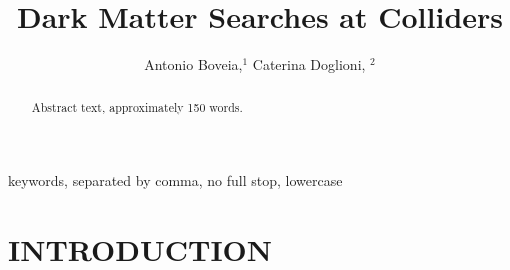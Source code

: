 \documentclass{ar-1col}
\begin{document}

\title{Dark Matter Searches at Colliders}

\newcommand{\chiDM}{\ensuremath{\chi}\xspace}
\newcommand{\IP}{\ensuremath{\textrm{IP}}\xspace}
\newcommand{\mMed}{\ensuremath{M_{\rm{med}}}\xspace}
\newcommand{\mmed}{\mMed}
\newcommand{\gDM}{\ensuremath{g_{\chiDM}}\xspace}
\newcommand{\gdm}{\gDM}
\newcommand{\gl}{$g_{\mathrm{l}}$\xspace}
\newcommand{\gdmq}{\ensuremath{g_{\chiDM q}}\xspace}
\newcommand{\gq}{$g_{\mathrm{q}}$\xspace}
\newcommand{\mdm}{\ensuremath{m_{\chiDM}}\xspace}
\newcommand{\mDM}{\mdm}
\newcommand{\ghZprimeZprime}{\ensuremath{g_{hZ'Z'}}\xspace}
\newcommand{\gZPrime}{\ensuremath{g_{Z'}}\xspace}
\newcommand{\gZprime}{\ensuremath{g_{Z'}}\xspace}
\newcommand{\sinthetab}{\ensuremath{sin(\theta_B}\xspace}
\newcommand{\sinthetahS}{\ensuremath{sin(\theta_{hS})}\xspace}
\newcommand{\pt}{\ensuremath{p_\mathrm{T}}\xspace}
\newcommand{\pT}{\ensuremath{p_\mathrm{T}}\xspace}
\newcommand{\MET}{\ensuremath{\slashed{E}_T}\xspace}
\newcommand{\Zprime}{\ensuremath{\mathrm{Z}^\prime}\xspace}
\newcommand{\fb}{\ensuremath{\mathrm{fb}}\xspace}
\newcommand{\pb}{\ensuremath{\mathrm{pb}}\xspace}
\newcommand{\ifb}{\ensuremath{\mathrm{fb}^{-1}}\xspace}
\newcommand{\ipb}{\ensuremath{\mathrm{pb}^{-1}}\xspace}

\author{Antonio Boveia,$^1$ Caterina Doglioni, $^2$
}

\begin{abstract}
Abstract text, approximately 150 words. 
\end{abstract}

\begin{keywords}
keywords, separated by comma, no full stop, lowercase
\end{keywords}
\maketitle

\tableofcontents


\section{INTRODUCTION}
\label{sec:intro}
\end{document}
